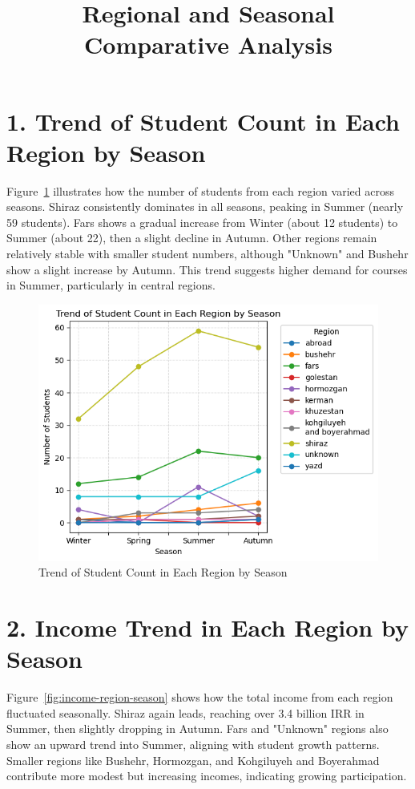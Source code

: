 \documentclass[12pt,a4paper]{article}
\title{Regional and Seasonal Comparative Analysis}
\date{}
\begin{document}
\maketitle

\section*{1. Trend of Student Count in Each Region by Season}
Figure~\ref{fig:student-count-region-season} illustrates how the number of students from each region varied across seasons. Shiraz consistently dominates in all seasons, peaking in Summer (nearly 59 students). Fars shows a gradual increase from Winter (about 12 students) to Summer (about 22), then a slight decline in Autumn. Other regions remain relatively stable with smaller student numbers, although "Unknown" and Bushehr show a slight increase by Autumn. This trend suggests higher demand for courses in Summer, particularly in central regions.

\begin{figure}[h!]
    \centering
    \includegraphics[width=1\textwidth]{Trend of Student Count in Each Region by Season.png}
    \caption{Trend of Student Count in Each Region by Season}
    \label{fig:student-count-region-season}
\end{figure}

\section*{2. Income Trend in Each Region by Season}
Figure~\ref{fig:income-region-season} shows how the total income from each region fluctuated seasonally. Shiraz again leads, reaching over 3.4 billion IRR in Summer, then slightly dropping in Autumn. Fars and "Unknown" regions also show an upward trend into Summer, aligning with student growth patterns. Smaller regions like Bushehr, Hormozgan, and Kohgiluyeh and Boyerahmad contribute more modest but increasing incomes, indicating growing participation.
\end{document}
